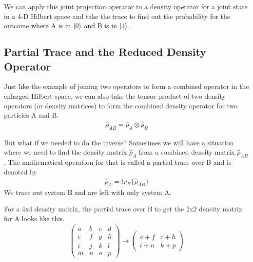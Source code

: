 \par We can apply this joint projection operator to a density operator for a joint state in a 4-D Hilbert space and take the trace to find out the probability for the outcome where A is in $\ket{0}$ and B is in $\ket{1}$.

\subsection{Partial Trace and the Reduced Density Operator}
\par Just like the example of joining two operators to form a combined operator in the enlarged Hilbert space, we can also take the tensor product of two density operators (or density matrices) to form the combined density operator for two particles A and B.
\begin{align*}
\hat{\rho}_{AB} = \hat{\rho}_A \otimes \hat{\rho}_B
\end{align*}
\par But what if we needed to do the inverse? Sometimes we will have a situation where we need to find the density matrix $\hat{\rho}_A$ from a combined density matrix $\hat{\rho}_{AB}$. The mathematical operation for that is called a partial trace over B and is denoted by
\begin{align*}
\hat{\rho}_A = tr_B\{ \hat{\rho}_{AB} \}
\end{align*}
We trace out system B and are left with only system A.
\par For a 4x4 density matrix, the partial trace over B to get the 2x2 density matrix for A looks like this.
\begin{align*}
\begin{pmatrix} a & b & c & d \\ e & f & g & h \\ i & j & k & l \\ m & n & o & p \end{pmatrix}
\rightarrow
\begin{pmatrix} a+f & c+h \\ i+n & k+p \end{pmatrix}
\end{align*}

